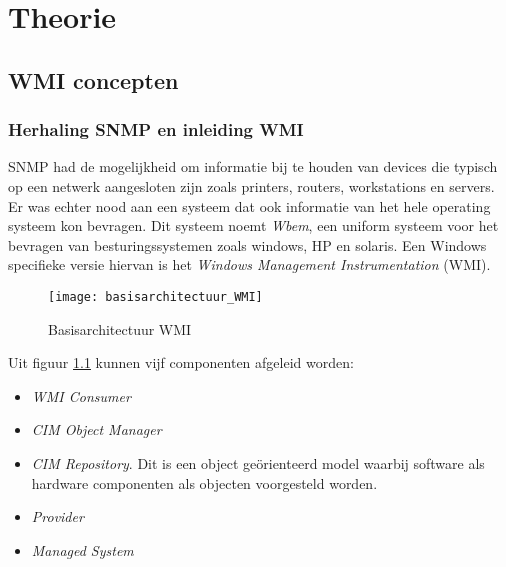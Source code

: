 \documentclass{report}
\begin{document}

	\tableofcontents

	\part{Theorie}
	\chapter{WMI concepten}
	\section{Herhaling SNMP en inleiding WMI}
	SNMP had de mogelijkheid om informatie bij te houden van devices die typisch op een netwerk aangesloten zijn zoals printers, routers, workstations en servers. Er was echter nood aan een systeem dat ook informatie van het hele operating systeem kon bevragen.
	Dit systeem noemt \textit{Wbem}, een uniform systeem voor het bevragen van besturingssystemen zoals windows, HP en solaris. Een Windows specifieke versie hiervan is het \textit{Windows Management Instrumentation} (WMI).
	\begin{figure}[h]
		\centering
		\texttt{[image: basisarchitectuur\_WMI]}
		\caption{Basisarchitectuur WMI}
		\label{fig:basisarchitectuur_WMI}
	\end{figure}

	Uit figuur \ref{fig:basisarchitectuur_WMI} kunnen vijf componenten afgeleid worden:
	\begin{itemize}
		\item \textit{WMI Consumer}
		\item \textit{CIM Object Manager}
		\item \textit{CIM Repository}. Dit is een object geörienteerd model waarbij software als hardware componenten als objecten voorgesteld worden. 
		\item \textit{Provider}
		\item \textit{Managed System}
	\end{itemize}
\end{document}
